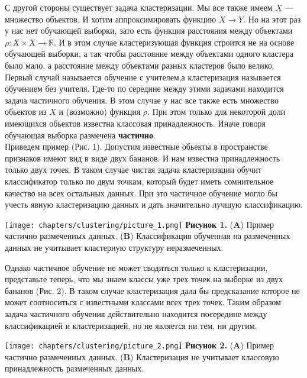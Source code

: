 С другой стороны существует задача кластеризации. Мы все также имеем $X$ --- множество объектов. И хотим аппроксимировать функцию $X \longrightarrow Y$. Но на этот раз у нас нет обучающей выборки, зато есть функция расстояния между объектами $\rho: X\times X \longrightarrow \mathbb{R}$. И в этом случае кластеризующая функция строится не на основе обучающей выборки, а так чтобы расстояние между объектами одного кластера было мало, а расстояние между объектами разных кластеров было велико. \\

Первый случай называется обучение с учителем,а кластеризация называется обучением без учителя. Где-то по середине между этими задачами находится задача частичного обучения. В этом случае у нас все также есть множество обьектов из $X$ и (возможно) функция $\rho$. При этом только для некоторой доли имеющихся обьектов известна классовая принадлежность. Иначе говоря обучающая выборка размечена \textbf{частично}. \\

Приведем пример (Рис. 1). Допустим известные обьекты в пространстве признаков имеют вид в виде двух бананов. И нам известна принадлежность только двух точек. В таком случае чистая задача кластеризации обучит классификатор только по двум точкам, который будет иметь сомнительное качество на всех остальных данных. При это частичное обучение могло бы учесть явную кластеризацию данных и дать значительно лучшую классификацию.\\

\begin{center}
\texttt{[image: chapters/clustering/picture\_1.png]}
\textbf{Рисунок 1.} (\textbf{A}) Пример частично размеченных данных. (\textbf{B}) Классификация обученная на размеченных данных не учитывает кластерную структуру неразмеченных. 
\end{center}

Однако частичное обучение не может сводиться только к кластеризации, представьте теперь, что мы знаем классы уже трех точек на выборке из двух бананов (Рис. 2). В таком случае кластеризация дала бы предсказание которое не может соотноситься с известными классами всех трех точек. Таким образом задача частичного обучения действительно находится посередине между классификацией и кластеризацией, но не является ни тем, ни другим. \\
\begin{center}
\texttt{[image: chapters/clustering/picture\_2.png]}
\textbf{Рисунок 2.} (\textbf{A}) Пример частично размеченных данных. (\textbf{B}) Кластеризация не учитывает классовую принадлежность размеченных данных. 
\end{center}

